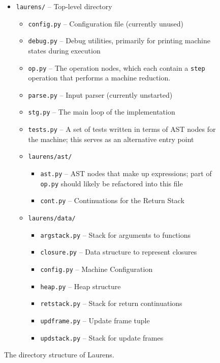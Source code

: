 \documentclass[preprint]{sigplanconf}
\begin{document}
\begin{figure}
\begin{itemize}
\item \lstinline{laurens/} -- Top-level directory
  \begin{itemize}
    \item \lstinline{config.py} -- Configuration file (currently unused)
    \item \lstinline{debug.py}  -- Debug utilities, primarily for printing
                                   machine states during execution
    \item \lstinline{op.py}     -- The operation nodes, which each contain
                                   a \lstinline{step} operation that performs
                                   a machine reduction.
    \item \lstinline{parse.py}  -- Input parser (currently unstarted)
    \item \lstinline{stg.py}    -- The main loop of the implementation
    \item \lstinline{tests.py}  -- A set of tests written in terms of AST
                                   nodes for the machine; this serves as
                                   an alternative entry point
  \item \lstinline{laurens/ast/}
    \begin{itemize}
      \item \lstinline{ast.py}  -- AST nodes that make up expressions;
                                   part of \lstinline{op.py} should likely be
                                   refactored into this file
      \item \lstinline{cont.py} -- Continuations for the  Return Stack 
    \end{itemize}
  \item \lstinline{laurens/data/}
    \begin{itemize}
      \item \lstinline{argstack.py} -- Stack for arguments to functions
      \item \lstinline{closure.py}  -- Data structure to represent closures
      \item \lstinline{config.py}   -- Machine Configuration
      \item \lstinline{heap.py}     -- Heap structure
      \item \lstinline{retstack.py} -- Stack for return continuations
      \item \lstinline{updframe.py} -- Update frame tuple
      \item \lstinline{updstack.py} -- Stack for update frames
    \end{itemize}
  \end{itemize}
\end{itemize}
\caption{\label{fig:dir}The directory structure of Laurens.}
\end{figure}
\end{document}
